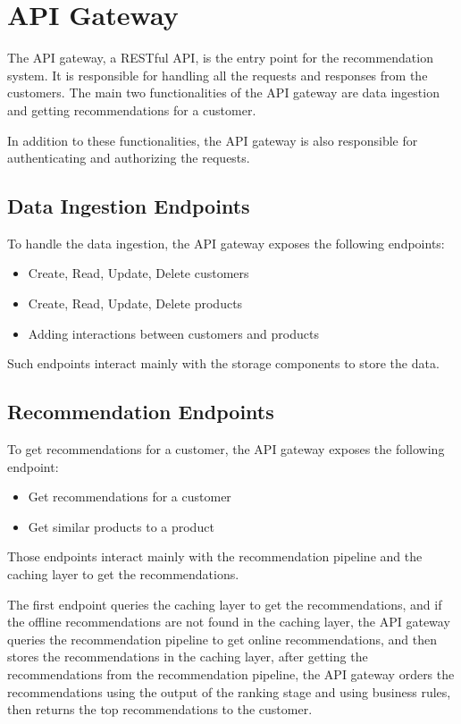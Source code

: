 \section{API Gateway}

The API gateway, a RESTful API, is the entry point for the recommendation system.
It is responsible for handling all the requests and responses from the customers.
The main two functionalities of the API gateway are data ingestion and getting recommendations for a customer.

In addition to these functionalities, the API gateway is also responsible for authenticating and authorizing the requests.

\subsection{Data Ingestion Endpoints}

To handle the data ingestion, the API gateway exposes the following endpoints:
\begin{itemize}
    \item Create, Read, Update, Delete customers
    \item Create, Read, Update, Delete products
    \item Adding interactions between customers and products
\end{itemize}

Such endpoints interact mainly with the storage components to store the data.

\subsection{Recommendation Endpoints}

To get recommendations for a customer, the API gateway exposes the following endpoint:
\begin{itemize}
    \item Get recommendations for a customer
    \item Get similar products to a product
\end{itemize}

Those endpoints interact mainly with the recommendation pipeline and the caching layer to get the recommendations.

The first endpoint queries the caching layer to get the recommendations, and if the offline recommendations are not found in the caching layer, 
the API gateway queries the recommendation pipeline to get online recommendations, and then stores the recommendations in the caching layer, 
after getting the recommendations from the recommendation pipeline, 
the API gateway orders the recommendations using the output of the ranking stage and using business rules, then returns the top recommendations to the customer.

